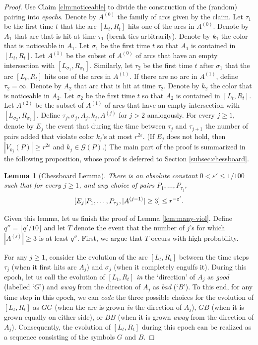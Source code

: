 \documentclass[10pt,a4paper]{article}
\newtheorem{lem}[theorem]{Lemma}
\theoremstyle{definition}%
\theoremstyle{plain}
\let\Pr\relax
\DeclareMathOperator*{\Pr}{\mathbb{P}}
\newcommand{\eps}{\varepsilon}
\newcommand{\calG}{\mathcal{G}}
\begin{document}
\begin{proof}
Use Claim \ref{clm:noticeable} to divide the construction of the (random) pairing into \emph{epochs}. Denote by $A^{(0)}$
the family of arcs given by the claim. Let $\tau_1$ be the first time $t$ that the arc $[L_t
, R_t
]$ hits one of
the arcs in $A^{(0)}$. Denote by $A_1$ that arc that is hit at time $\tau_1$ (break ties arbitrarily). Denote by
$k_1$ the color that is noticeable in $A_1$. Let $\sigma_1$ be the first time $t$ so that $A_1$ is contained in $[L_t
, R_t
]$.
Let $A^{(1)}$ be the subset of $A^{(0)}$ of arcs that have an empty intersection with $[L_{\sigma_1}
, R_{\sigma_1}
]$. Similarly,
let $\tau_2$ be the first time $t$ after $ \sigma_1$ that the arc $[L_t
, R_t
]$ hits one of the arcs in $A^{(1)}$. If there are no
arc in $A^{(1)}$, define $\tau_2 = \infty$. Denote by $A_2$ that arc that is hit at time $\tau_2$. Denote by $k_2$ the color that
is noticeable in $A_2$. 
Let $\sigma_2$ be the first time $t$ so that $A_2$ is contained in $[L_t, R_t]$. 
Let $A^{(2)}$ be the subset of $A^{(1)}$ of arcs that have an empty intersection with $[L_{\sigma_2}, R_{\sigma_2}]$. 
Define $\tau_j , \sigma_j , A_j , k_j, A^{(j)}$ for $j > 2$ analogously.
For every $j \geq 1$, denote by $E_j$ the event that during the time between $\tau_j$ and $\tau_{j+1}$ the number of
pairs added that violate color $k_j$'s at most $r^{2\eps}$. (If $E_j$ does not hold, then $|V_{k_j}
(P)| \geq r^{2\eps}$ and $k_j\in \calG(P)$.) 
The main part of the proof is summarized in the following proposition, whose proof is deferred to
Section \ref{subsec:chessboard}.

\begin{lem}[Chessboard Lemma]\label{lem:chessboard}
There is an absolute constant $0<\eps'\leq 1/100$ such that for every $j \geq 1$, and any choice of pairs $P_1,\ldots,P_{\tau_j}$,
\[\Pr[E_j|P_1,\ldots, P_{\tau_j}, |A^{(j-1)}| \geq 3]\leq r^{-\eps'}.\]
\end{lem}

Given this lemma, let us finish the proof of Lemma \ref{lem:many-viol}. Define $q'' = \lfloor q'/10 \rfloor$ and let $T$ denote the event that the number of $j$'s for which $|A^{(j)}|\geq 3$ is at least $q''$. First, we argue that $T$ occurs with high probability. 

For any $j\geq 1$, consider the evolution of the arc $[L_t,R_t]$ between the time steps $\tau_j$ (when it first hits arc $A_j$) and $\sigma_j$ (when it completely engulfs it). During this epoch, let us call the evolution of $[L_t,R_t]$ \emph{in} the `direction' of $A_j$ as \emph{good} (labelled `$G$') and \emph{away} from the direction of $A_j$ as \emph{bad} (`$B$'). To this end, for any time step in this epoch, we can \emph{code} the three possible choices for the evolution of $[L_t,R_t]$ as $GG$ (when the arc is grown \emph{in} the direction of $A_j$), $GB$ (when it is grown equally on either side), or $BB$ (when it is grown \emph{away} from the direction of $A_j$). Consequently, the evolution of $[L_t,R_t]$ during this epoch can be realized as a sequence consisting of the symbols $G$ and $B$.


\end{proof}
\end{document}
